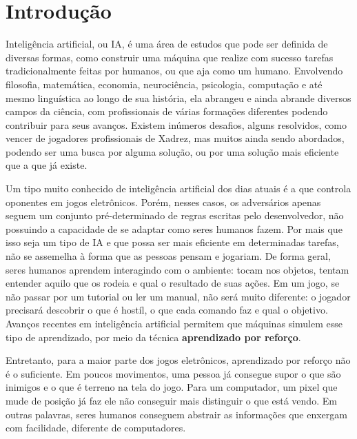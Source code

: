 \chapter{Introdução}
\label{cap:introducao}

Inteligência artificial, ou IA, é uma área de estudos que pode ser definida de diversas formas, como construir uma máquina que realize com sucesso tarefas tradicionalmente feitas por humanos, ou que aja como um humano.
Envolvendo filosofia, matemática, economia, neurociência, psicologia, computação e até mesmo linguística ao longo de sua história, ela abrangeu e ainda abrande diversos campos da ciência, com profissionais de várias formações diferentes podendo contribuir para seus avanços.
Existem inúmeros desafios, alguns resolvidos, como vencer de jogadores profissionais de Xadrez, mas muitos ainda sendo abordados, podendo ser uma busca por alguma solução, ou por uma solução mais eficiente que a que já existe.

Um tipo muito conhecido de inteligência artificial dos dias atuais é a que controla oponentes em jogos eletrônicos.
Porém, nesses casos, os adversários apenas seguem um conjunto pré-determinado de regras escritas pelo desenvolvedor, não possuindo a capacidade de se adaptar como seres humanos fazem.
Por mais que isso seja um tipo de IA e que possa ser mais eficiente em determinadas tarefas, não se assemelha à forma que as pessoas pensam e jogariam.
De forma geral, seres humanos aprendem interagindo com o ambiente: tocam nos objetos, tentam entender aquilo que os rodeia e qual o resultado de suas ações.
Em um jogo, se não passar por um tutorial ou ler um manual, não será muito diferente: o jogador precisará descobrir o que é hostíl, o que cada comando faz e qual o objetivo.
Avanços recentes em inteligência artificial permitem que máquinas simulem esse tipo de aprendizado, por meio da técnica \textbf{aprendizado por reforço}.

Entretanto, para a maior parte dos jogos eletrônicos, aprendizado por reforço não é o suficiente.
Em poucos movimentos, uma pessoa já consegue supor o que são inimigos e o que é terreno na tela do jogo.
Para um computador, um pixel que mude de posição já faz ele não conseguir mais distinguir o que está vendo.
Em outras palavras, seres humanos conseguem abstrair as informações que enxergam com facilidade, diferente de computadores.

